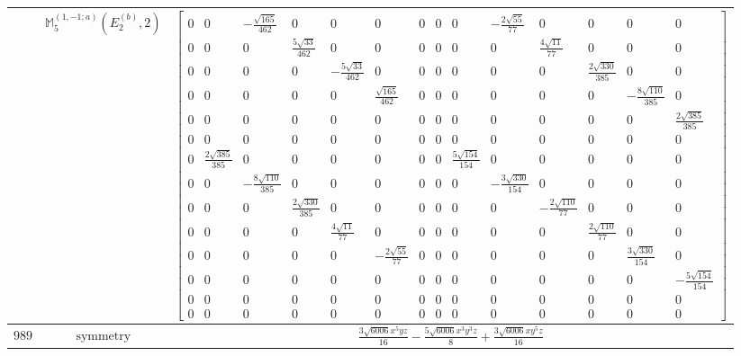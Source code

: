 \documentclass[fleqn,8pt,landscape]{jsarticle}
\begin{document}
\begin{longtable}{ccc}
$  $ & $ \mathbb{M}_{5}^{(1,-1;a)}(E_{2}^{(b)},2) $ & $ \begin{bmatrix} 0 & 0 & - \frac{\sqrt{165}}{462} & 0 & 0 & 0 & 0 & 0 & 0 & - \frac{2 \sqrt{55}}{77} & 0 & 0 & 0 & 0 \\ 0 & 0 & 0 & \frac{5 \sqrt{33}}{462} & 0 & 0 & 0 & 0 & 0 & 0 & \frac{4 \sqrt{11}}{77} & 0 & 0 & 0 \\ 0 & 0 & 0 & 0 & - \frac{5 \sqrt{33}}{462} & 0 & 0 & 0 & 0 & 0 & 0 & \frac{2 \sqrt{330}}{385} & 0 & 0 \\ 0 & 0 & 0 & 0 & 0 & \frac{\sqrt{165}}{462} & 0 & 0 & 0 & 0 & 0 & 0 & - \frac{8 \sqrt{110}}{385} & 0 \\ 0 & 0 & 0 & 0 & 0 & 0 & 0 & 0 & 0 & 0 & 0 & 0 & 0 & \frac{2 \sqrt{385}}{385} \\ 0 & 0 & 0 & 0 & 0 & 0 & 0 & 0 & 0 & 0 & 0 & 0 & 0 & 0 \\ 0 & \frac{2 \sqrt{385}}{385} & 0 & 0 & 0 & 0 & 0 & 0 & \frac{5 \sqrt{154}}{154} & 0 & 0 & 0 & 0 & 0 \\ 0 & 0 & - \frac{8 \sqrt{110}}{385} & 0 & 0 & 0 & 0 & 0 & 0 & - \frac{3 \sqrt{330}}{154} & 0 & 0 & 0 & 0 \\ 0 & 0 & 0 & \frac{2 \sqrt{330}}{385} & 0 & 0 & 0 & 0 & 0 & 0 & - \frac{2 \sqrt{110}}{77} & 0 & 0 & 0 \\ 0 & 0 & 0 & 0 & \frac{4 \sqrt{11}}{77} & 0 & 0 & 0 & 0 & 0 & 0 & \frac{2 \sqrt{110}}{77} & 0 & 0 \\ 0 & 0 & 0 & 0 & 0 & - \frac{2 \sqrt{55}}{77} & 0 & 0 & 0 & 0 & 0 & 0 & \frac{3 \sqrt{330}}{154} & 0 \\ 0 & 0 & 0 & 0 & 0 & 0 & 0 & 0 & 0 & 0 & 0 & 0 & 0 & - \frac{5 \sqrt{154}}{154} \\ 0 & 0 & 0 & 0 & 0 & 0 & 0 & 0 & 0 & 0 & 0 & 0 & 0 & 0 \\ 0 & 0 & 0 & 0 & 0 & 0 & 0 & 0 & 0 & 0 & 0 & 0 & 0 & 0 \end{bmatrix} $ \\ \hline
$ 989 $ & $ \text{symmetry} $ & $ \frac{3 \sqrt{6006} x^{5} y z}{16} - \frac{5 \sqrt{6006} x^{3} y^{3} z}{8} + \frac{3 \sqrt{6006} x y^{5} z}{16} $ \\

\end{longtable}
\end{document}
